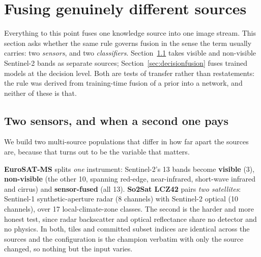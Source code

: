 \section{Fusing genuinely different sources}\label{sec:multisource}

Everything to this point fuses one knowledge source into one image stream.
This section asks whether the same rule governs fusion in the sense the
term usually carries: two \emph{sensors}, and two \emph{classifiers}.
Section~\ref{sec:multisensor} takes visible and non-visible Sentinel-2
bands as separate sources; Section~\ref{sec:decisionfusion} fuses trained
models at the decision level. Both are tests of transfer rather than
restatements: the rule was derived from training-time fusion of a prior
into a network, and neither of these is that.

\subsection{Two sensors, and when a second one pays}\label{sec:multisensor}
We build two multi-source populations that differ in how far apart the
sources are, because that turns out to be the variable that matters.

\textbf{EuroSAT-MS} splits \emph{one} instrument: Sentinel-2's 13 bands
become \textbf{visible} (3), \textbf{non-visible} (the other 10, spanning
red-edge, near-infrared, short-wave infrared and cirrus) and
\textbf{sensor-fused} (all 13). \textbf{So2Sat LCZ42} pairs \emph{two
satellites}: Sentinel-1 synthetic-aperture radar (8 channels) with
Sentinel-2 optical (10 channels), over 17 local-climate-zone classes. The
second is the harder and more honest test, since radar backscatter and
optical reflectance share no detector and no physics. In both, tiles and
committed subset indices are identical across the sources and the
configuration is the champion verbatim with only the source changed, so
nothing but the input varies.


